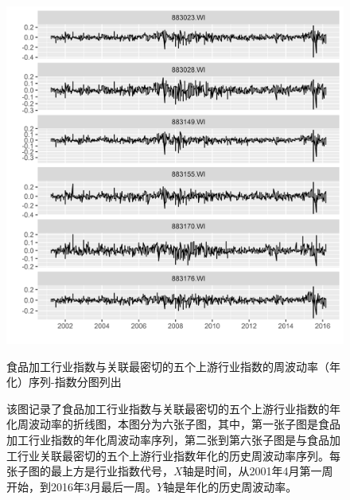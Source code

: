 \documentclass{sysuthesis}
\begin{document}
  \begin{figure}[htbp]
  \centering
  \includegraphics[scale=0.8]{image/883111-topk-upper-plus-one-weeklyvol-single.png}
  \caption{食品加工行业指数与关联最密切的五个上游行业指数的周波动率（年化）序列-指数分图列出}
  \caption*{\footnotesize 该图记录了食品加工行业指数与关联最密切的五个上游行业指数的年化周波动率的折线图，本图分为六张子图，其中，第一张子图是食品加工行业指数的年化周波动率序列，第二张到第六张子图是与食品加工行业关联最密切的五个上游行业指数年化的历史周波动率序列。每张子图的最上方是行业指数代号，$X$轴是时间，从2001年4月第一周开始，到2016年3月最后一周。$Y$轴是年化的历史周波动率。}
  \label{fig:883111-topk-upper-plus-one-weeklyvol-single}
  \end{figure}
\end{document}
